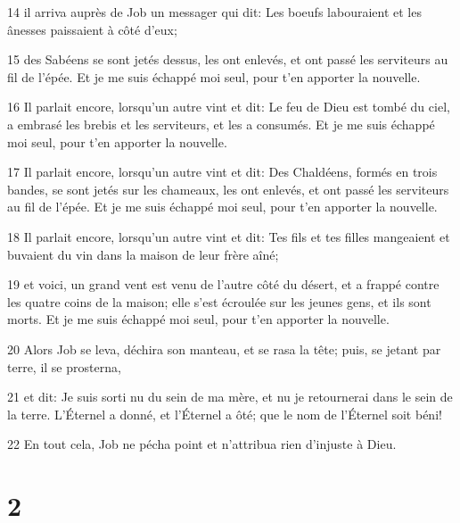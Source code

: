 \par 14 il arriva auprès de Job un messager qui dit: Les boeufs labouraient et les ânesses paissaient à côté d'eux;
\par 15 des Sabéens se sont jetés dessus, les ont enlevés, et ont passé les serviteurs au fil de l'épée. Et je me suis échappé moi seul, pour t'en apporter la nouvelle.
\par 16 Il parlait encore, lorsqu'un autre vint et dit: Le feu de Dieu est tombé du ciel, a embrasé les brebis et les serviteurs, et les a consumés. Et je me suis échappé moi seul, pour t'en apporter la nouvelle.
\par 17 Il parlait encore, lorsqu'un autre vint et dit: Des Chaldéens, formés en trois bandes, se sont jetés sur les chameaux, les ont enlevés, et ont passé les serviteurs au fil de l'épée. Et je me suis échappé moi seul, pour t'en apporter la nouvelle.
\par 18 Il parlait encore, lorsqu'un autre vint et dit: Tes fils et tes filles mangeaient et buvaient du vin dans la maison de leur frère aîné;
\par 19 et voici, un grand vent est venu de l'autre côté du désert, et a frappé contre les quatre coins de la maison; elle s'est écroulée sur les jeunes gens, et ils sont morts. Et je me suis échappé moi seul, pour t'en apporter la nouvelle.
\par 20 Alors Job se leva, déchira son manteau, et se rasa la tête; puis, se jetant par terre, il se prosterna,
\par 21 et dit: Je suis sorti nu du sein de ma mère, et nu je retournerai dans le sein de la terre. L'Éternel a donné, et l'Éternel a ôté; que le nom de l'Éternel soit béni!
\par 22 En tout cela, Job ne pécha point et n'attribua rien d'injuste à Dieu.

\chapter{2}

